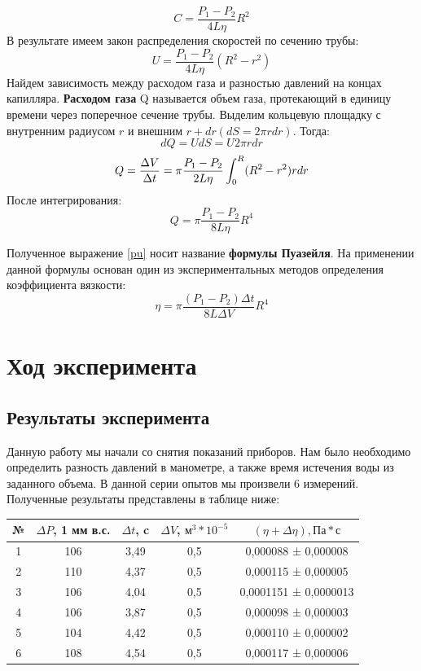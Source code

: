 \documentclass[a4paper,12pt]{article}
\begin{document}
$$C = \frac{P_1 - P_2}{4L\eta}R^2$$
В результате имеем закон распределения скоростей по сечению трубы:
\begin{equation}\label{distrib}
U = \frac{P_1 - P_2}{4L\eta}(R^2-r^2)
\end{equation}
Найдем зависимость между расходом газа и разностью давлений на
концах капилляра. \textbf{Расходом газа} Q называется объем газа, протекающий в единицу времени через поперечное сечение трубы.
Выделим кольцевую площадку с внутренним радиусом $r$ и внешним $r + dr (dS = 2\pi rdr)$. Тогда:
$$dQ = UdS = U2\pi rdr$$
$$Q = \frac{\Delta V}{\Delta t} = \pi\frac{P_1 - P_2}{2L\eta}\int_0^R(R^2-r^2)rdr \vspace{0.2cm}$$
После интегрирования:
\begin{equation}\label{pu}
Q = \pi\frac{P_1 - P_2}{8L\eta}R^4
\end{equation}
	
Полученное выражение \eqref{pu} носит название \textbf{формулы Пуазейля}. На применении данной формулы основан один из экспериментальных методов определения коэффициента вязкости:
\begin{equation}
\eta = \pi\frac{(P_1-P_2)\Delta t}{8L\Delta V}R^4
\end{equation}
	
\newpage
\section{Ход эксперимента}
\subsection{Результаты эксперимента}
\hspace{\parindent}Данную работу мы начали со снятия показаний приборов. Нам было необходимо определить разность давлений в манометре, а также время истечения воды из заданного объема. В данной серии опытов мы произвели 6 измерений. Полученные результаты представлены в таблице ниже:
	
	
\begin{center}
	\begin{tabular}{|c|c|c|c|c|} 
		\hline
		
		№&$\Delta P$, 1 мм в.с.&$\Delta t$, c&$\Delta V$, ${м^3}*10^{-5}$&$(\eta +\Delta\eta), Па*с$\\
		\hline
		1& 106 & 3,49 & 0,5 & 0,000088 ± 0,000008
		\\
		2& 110 & 4,37 & 0,5 & 0,000115 ± 0,000005
		\\
		3& 106 & 4,04 & 0,5 & 0,0001151 ± 0,0000013
		\\
		4& 106 & 3,87 & 0,5 & 0,000098 ± 0,000003
		\\
		5& 104 & 4,42 & 0,5 & 0,000110 ± 0,000002
		\\ 
		6& 108 & 4,54 & 0,5 & 0,000117 ± 0,000006
		\\
		\hline
	\end{tabular}
\end{center}
	
\end{document}
